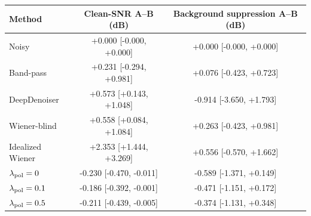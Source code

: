 \begin{tabular}{lcc}
\toprule
Method & Clean-SNR A--B (dB) & Background suppression A--B (dB) \\
\midrule
Noisy & +0.000 [-0.000, +0.000] & +0.000 [-0.000, +0.000] \\
Band-pass & +0.231 [-0.294, +0.981] & +0.076 [-0.423, +0.723] \\
DeepDenoiser & +0.573 [+0.143, +1.048] & -0.914 [-3.650, +1.793] \\
Wiener-blind & +0.558 [+0.084, +1.084] & +0.263 [-0.423, +0.981] \\
Idealized Wiener & +2.353 [+1.444, +3.269] & +0.556 [-0.570, +1.662] \\
$\lambda_{\mathrm{pol}}=0$ & -0.230 [-0.470, -0.011] & -0.589 [-1.371, +0.149] \\
$\lambda_{\mathrm{pol}}=0.1$ & -0.186 [-0.392, -0.001] & -0.471 [-1.151, +0.172] \\
$\lambda_{\mathrm{pol}}=0.5$ & -0.211 [-0.439, -0.005] & -0.374 [-1.131, +0.348] \\
\bottomrule
\end{tabular}
